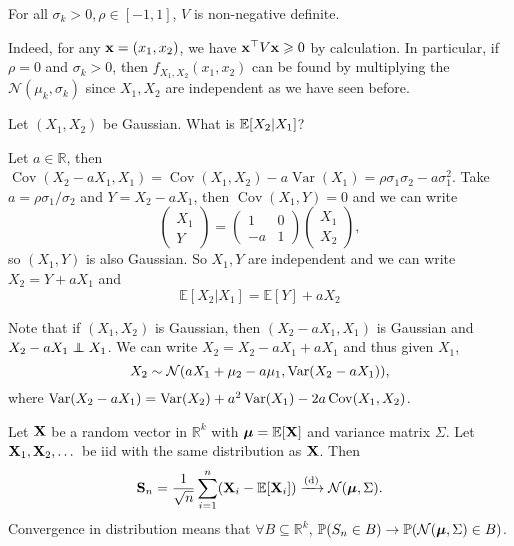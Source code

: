 \begin{claim}
    For all $ \sigma_k>0,\rho\in [-1,1] $, $V$ is non-negative definite.
\end{claim}
Indeed, for any ${\bf x}=(x_1,x_2)$, we have ${\bf x}^\top V{\bf x}\geqslant 0$ by calculation. In particular, if $\rho=0$ and $\sigma_k>0$, then $f_{X_1,X_2}(x_1,x_2)$ can be found by multiplying the $\mathcal N(\mu_k,\sigma_k)$ since $X_1,X_2$ are independent as we have seen before.


\begin{sque}
    Let $ (X_1,X_2) $ be Gaussian. What is $ {\mathbb{E}}[X_2|X_1] $?
\end{sque}

Let $a\in\mathbb R$, then $\operatorname{Cov}(X_2-aX_1,X_1)=\operatorname{Cov}(X_1,X_2)-a\operatorname{Var}(X_1)=\rho\sigma_1\sigma_2-a\sigma_1^2$. Take $a=\rho\sigma_1/\sigma_2$ and $Y=X_2-aX_1$, then $\operatorname{Cov}(X_1,Y)=0$ and we can write
$$\begin{pmatrix}
    X_1\\
    Y
\end{pmatrix}=\begin{pmatrix}
    1&0\\
    -a&1
\end{pmatrix}\begin{pmatrix}
    X_1\\
    X_2
\end{pmatrix},$$
so $(X_1,Y)$ is also Gaussian. So $X_1,Y$ are independent and we can write $X_2=Y+aX_1$ and
\[
    \boxed{\mathbb E[X_2|X_1]=\mathbb E[Y]+aX_2}
\]
\begin{note}
    Note that if $ (X_1,X_2) $ is Gaussian, then $ (X_2-aX_1,X_1) $ is Gaussian and $ X_2-aX_1 \independent X_1 $. We can write $ X_2=X_2-aX_1+aX_1 $ and thus given $ X_1 $, 
    \[
        X_2 \sim {\mathcal{N}} (aX_1+\mu_2-a\mu_1, \operatorname{Var}(X_2-aX_1)),
    \]
    where $ \operatorname{Var}(X_2-aX_1) =\operatorname{Var}(X_2)+a^2\operatorname{Var}(X_1)-2a\operatorname{Cov}(X_1,X_2)  $.
\end{note}

\begin{theorem}
    Let $ {\bf X} $ be a random vector in $ \mathbb{R}^{k} $ with $ \boldsymbol{\mu}={\mathbb{E}}[{\bf X}] $ and variance matrix $ \Sigma $. Let $ {\bf X}_1,{\bf X}_2,\dots $ be iid with the same distribution as $ {\bf X} $. Then 
    \[
        {\bf S}_n=\frac{1}{\sqrt{n}}\sum_{i=1}^n({\bf X}_i-\mathbb E[{\bf X}_i])\xrightarrow{\text{(d)}}\mathcal N(\boldsymbol{\mu},\Sigma).
    \]
    Convergence in distribution means that $ \forall B \subseteq \mathbb{R}^{k} $, $ \mathbb{P}(S_n\in B) \to \mathbb{P}({\mathcal{N}}(\boldsymbol{\mu},\Sigma)\in B) $.
\end{theorem}


